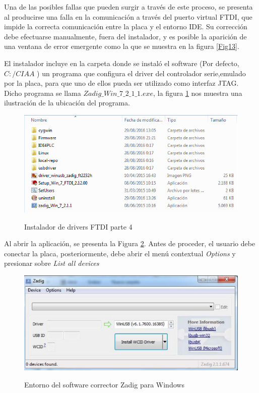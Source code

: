 \documentclass[12pt,letterpaper]{article}
\begin{document}
Una de las posibles fallas que pueden surgir a través de este proceso, se presenta al producirse una falla en la comunicación a través del puerto virtual FTDI, que impide la correcta comunicación entre la placa y el entorno IDE. Su corrección debe efectuarse manualmente, fuera del instalador, y es posible la aparición de una ventana de error emergente como la que se muestra en la figura \ref{Fig13}.

El instalador incluye en la carpeta donde se instaló el software (Por defecto, $ C:/CIAA $ ) un programa que configura el driver del controlador serie,emulado por la placa, para que uno de ellos pueda ser utilizado como interfaz JTAG. Dicho programa se llama $ Zadig\_Win\_7\_2\_1\_1.exe $, la figura \ref{Fig14} nos muestra una ilustración de la ubicación del programa.

\begin{center}
\begin{figure}[!h]
\centering
\includegraphics[width=8 cm]{figuras/instalacion12.png}\\
\caption{Instalador de drivers FTDI parte 4}
\label{Fig14}
\end{figure}
\end{center}

Al abrir la aplicación, se presenta la Figura \ref{Fig15}. Antes de proceder, el usuario debe conectar la placa, posteriormente, debe abrir el menú contextual \textit{Options} y presionar sobre \textit{List all devices}\\

\begin{center}
\begin{figure}[!h]
\centering
\includegraphics[width=8 cm]{figuras/instalacion13.png}\\
\caption{Entorno del software corrector Zadig para Windows}
\label{Fig15}
\end{figure}
\end{center}
\end{document}

